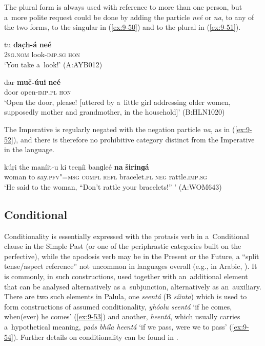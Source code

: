 The plural form is always used with reference to more than one person, but a~more polite request could be done by adding the particle \textit{neé} or \textit{na}, to any of the two forms, to the singular in (\ref{ex:9-50}) and to the plural in (\ref{ex:9-51}).

\begin{exe}
\ex
\label{ex:9-50}
\gll tu \textbf{dac̣h-á} \textbf{neé} \\
\textsc{2sg.nom} look-\textsc{imp.sg} \textsc{hon}  \\
\glt `You take a~look!' (A:AYB012)

\ex
\label{ex:9-51}
\gll dar \textbf{muč-úui} \textbf{neé} \\
door open-\textsc{imp.pl} \textsc{hon} \\
\glt `Open the door, please! [uttered by a~little girl addressing older women, supposedly mother and grandmother, in the household]' (B:HLN1020)
\end{exe}

The Imperative is regularly negated with the negation particle \textit{na}, as in (\ref{ex:9-52}), and there is therefore no prohibitive category distinct from the Imperative in the language.

\begin{exe}
\ex
\label{ex:9-52}
\gll kúṛi the maníit-u ki teeṇíi banɡleé \textbf{na} \textbf{širinɡá} \\
woman to say.\textsc{pfv"=msg} \textsc{compl} \textsc{refl} bracelet.\textsc{pl} \textsc{neg} rattle.\textsc{imp.sg} \\
\glt `He said to the woman, ``Don't rattle your bracelets!'' ' (A:WOM643)
\end{exe}

\subsection{Conditional}
\label{subsec:9-2-2}

Conditionality is essentially expressed with the protasis verb in a~Conditional clause in the Simple Past (or one of the periphrastic categories built on the perfective), while the apodosis verb may be in the Present or the Future, a ``split tense/aspect reference'' not uncommon in languages overall (e.g., in Arabic, \citealt[80]{dahl1985}). It is commonly, in such constructions, used together with an~additional element that can be analysed alternatively as a~subjunction, alternatively as an~auxiliary. There are two such elements in Palula, one \textit{seentá} (B \textit{síinta}) which is used to form constructions of assumed conditionality, \textit{yhóolu seentá} `if he comes, when(ever) he comes' (\ref{ex:9-53}) and another, \textit{heentá}, which usually carries a~hypothetical meaning, \textit{paás bhíla heentá} `if we pass, were we to pass' (\ref{ex:9-54}). Further details on conditionality can be found in . 

